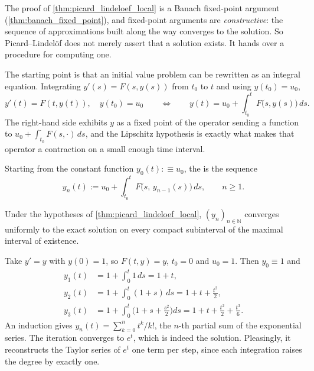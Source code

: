 The proof of \cref{thm:picard_lindeloef_local} is a Banach fixed-point argument
(\cref{thm:banach_fixed_point}), and fixed-point arguments are \emph{constructive}: the sequence
of approximations built along the way converges to the solution. So Picard--Lindelöf does not
merely assert that a solution exists. It hands over a procedure for computing one.

The starting point is that an initial value problem can be rewritten as an integral equation.
Integrating $y'(s) = F(s,y(s))$ from $t_0$ to $t$ and using $y(t_0) = u_0$,
\[y'(t) = F(t,y(t)),\quad y(t_0) = u_0
  \qquad\Longleftrightarrow\qquad
  y(t) = u_0 + \int_{t_0}^{t} F\big(s,y(s)\big)\,ds.\]
The right-hand side exhibits $y$ as a fixed point of the operator sending a function to
$u_0 + \int_{t_0}^{\cdot}F(s,\cdot)\,ds$, and the Lipschitz hypothesis is exactly what makes that
operator a contraction on a small enough time interval.

\begin{definition}
\label{def:picard_iteration}
Starting from the constant function $y_0(t) :\equiv u_0$, the 
 is the sequence
\[y_n(t) := u_0 + \int_{t_0}^{t} F\big(s,\,y_{n-1}(s)\big)\,ds, \qquad n \geq 1.\]
\end{definition}

Under the hypotheses of \cref{thm:picard_lindeloef_local}, $(y_n)_{n\in\mathbb{N}}$ converges
uniformly to the exact solution on every compact subinterval of the maximal interval of
existence.

\begin{aiexample}
\label{ex:picard_iteration_exponential}
Take $y' = y$ with $y(0) = 1$, so $F(t,y) = y$, $t_0 = 0$ and $u_0 = 1$. Then $y_0 \equiv 1$ and
\begin{align*}
  y_1(t) &= 1 + \int_0^t 1\,ds = 1+t, \\
  y_2(t) &= 1 + \int_0^t (1+s)\,ds = 1+t+\tfrac{t^2}{2}, \\
  y_3(t) &= 1 + \int_0^t \Big(1+s+\tfrac{s^2}{2}\Big)ds = 1+t+\tfrac{t^2}{2}+\tfrac{t^3}{6}.
\end{align*}
An induction gives $y_n(t) = \sum_{k=0}^{n} t^k/k!$, the $n$-th partial sum of the exponential
series. The iteration converges to $e^t$, which is indeed the solution. Pleasingly, it
reconstructs the Taylor series of $e^t$ one term per step, since each integration raises the
degree by exactly one.
\end{aiexample}

